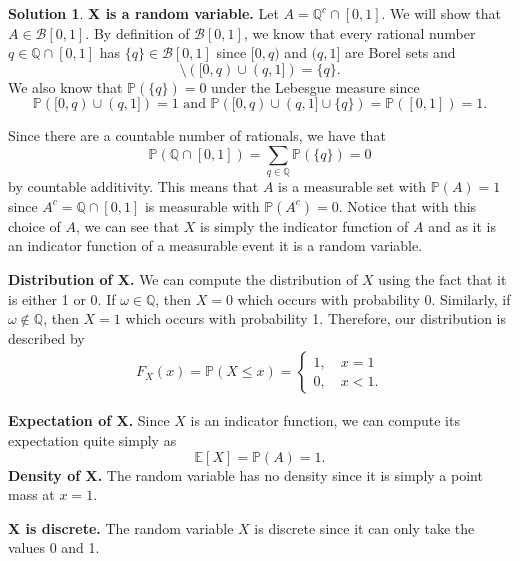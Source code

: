 \documentclass[12pt]{article}
\newcommand{\bbQ}{\mathbb{Q}}
\newcommand{\Prob}{\mathbb{P}}
\newcommand{\Expect}[1]{\mathbb{E}\left[#1 \right]}
\theoremstyle{definition}
\newtheorem{sol}{Solution}
\theoremstyle{remark}
\begin{document}
\begin{sol}\leavevmode
    
 \textbf{X is a random variable. }%
    Let $A = \bbQ^c \cap [0,1]$. We will show that $A\in \mathcal{B}[0,1]$. By definition of $\mathcal{B}[0,1]$, we know that every rational number $q\in \bbQ\cap[0,1]$ has $\{ q\} \in \mathcal{B}[0,1]$ since $[0, q)$ and $(q,1]$ are Borel sets and
    \begin{equation}
        [0,1] \setminus ([0,q) \cup (q,1]) = \{q \}.
    \end{equation} We also know that $\Prob(\{q\}) = 0$ under the Lebesgue measure since 
    \begin{equation}
        \Prob([0,q) \cup (q,1]) = 1 \text{ and } \Prob( [0,q ) \cup (q,1] \cup \{q \}) = \Prob( [0,1]) = 1.
    \end{equation}

    Since there are a countable number of rationals, we have that
    \begin{equation}
        \Prob( \bbQ \cap [0,1] ) = \sum_{q \in \bbQ} \Prob(\{ q\}) = 0
    \end{equation}
    by countable additivity. This means that $A$ is a measurable set with $\Prob(A) = 1$ since $A^c = \bbQ \cap [0,1]$ is measurable with $\Prob(A^c) = 0$. Notice that with this choice of $A$, we can see that $X$ is simply the indicator function of $A$ and as it is an indicator function of a measurable event it is a random variable. 

\textbf{Distribution of X. }%
We can compute the distribution of $X$ using the fact that it is either 1 or 0. If $\omega \in \bbQ$, then $X = 0$ which occurs with probability 0. Similarly, if $\omega\notin\bbQ$, then $X=1$ which occurs with probability 1. Therefore, our distribution is described by
\begin{align}
    F_X(x) = \Prob(X \leq x) = \begin{cases}
        1, \quad x=1\\
        0, \quad x<1.
    \end{cases}
\end{align}

\textbf{Expectation of X.}
Since $X$ is an indicator function, we can compute its expectation quite simply as
\begin{equation}
    \Expect X = \Prob(A) = 1.
\end{equation}
\textbf{Density of X.} 
The random variable has no density since it is simply a point mass at $x=1$.

\textbf{X is discrete.} The random variable $X$ is discrete since it can only take the values 0 and 1.
\end{sol}
\end{document}
